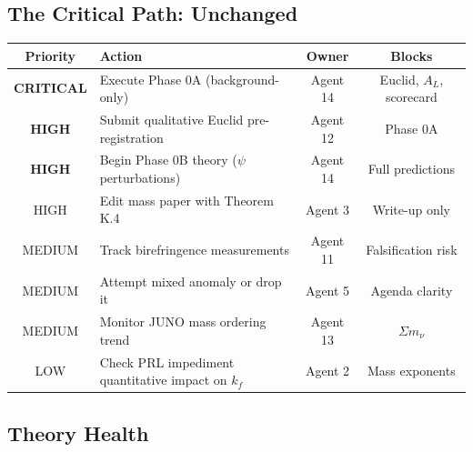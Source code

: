 \documentclass[11pt,a4paper]{article}
\begin{document}
\subsection{The Critical Path: Unchanged}

\begin{center}
\begin{tabular}{clcc}
\toprule
\textbf{Priority} & \textbf{Action} & \textbf{Owner} & \textbf{Blocks} \\
\midrule
\textbf{CRITICAL} & Execute Phase 0A (background-only) & Agent 14 & Euclid, $A_L$, scorecard \\
\textbf{HIGH} & Submit qualitative Euclid pre-registration & Agent 12 & Phase 0A \\
\textbf{HIGH} & Begin Phase 0B theory ($\psi$ perturbations) & Agent 14 & Full predictions \\
HIGH & Edit mass paper with Theorem K.4 & Agent 3 & Write-up only \\
MEDIUM & Track birefringence measurements & Agent 11 & Falsification risk \\
MEDIUM & Attempt mixed anomaly or drop it & Agent 5 & Agenda clarity \\
MEDIUM & Monitor JUNO mass ordering trend & Agent 13 & $\Sigma m_\nu$ \\
LOW & Check PRL impediment quantitative impact on $k_f$ & Agent 2 & Mass exponents \\
\bottomrule
\end{tabular}
\end{center}

\subsection{Theory Health}
\end{document}
